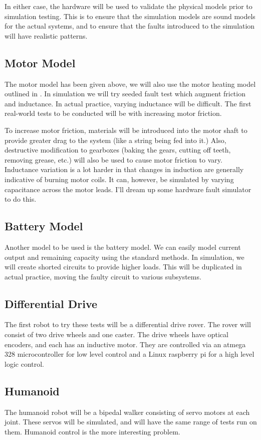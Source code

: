 \documentclass[12pt]{article}
\begin{document}
In either case, the hardware will be used to validate the physical
models prior to simulation testing.  This is to ensure that the
simulation models are sound models for the actual systems, and to
ensure that the faults introduced to the simulation will have
realistic patterns.

\subsection{Motor Model}
The motor model has been given above, we will also use the motor
heating model outlined in \cite{balaban}.  In simulation we will try
seeded fault test which augment friction and inductance.  In actual
practice, varying inductance will be difficult.  The first real-world
tests to be conducted will be with increasing motor friction.

To increase motor friction, materials will be introduced into the
motor shaft to provide greater drag to the system (like a string being
fed into it.)  Also, destructive modification to gearboxes (baking the
gears, cutting off teeth, removing grease, etc.) will also be used to
cause motor friction to vary.  Inductance variation is a lot harder in
that changes in induction are generally indicative of burning motor
coils.  It can, however, be simulated by varying capacitance across
the motor leads.  I'll dream up some hardware fault simulator to do
this.


\subsection{Battery Model}
Another model to be used is the battery model.  We can easily model
current output and remaining capacity using the standard methods.  In
simulation, we will create shorted circuits to provide higher loads.
This will be duplicated in actual practice, moving the faulty circuit
to various subsystems.

\subsection{Differential Drive}
The first robot to try these tests will be a differential drive
rover.  The rover will consist of two drive wheels and one caster.
The drive wheels have optical encoders, and each has an inductive
motor.  They are controlled via an atmega 328 microcontroller for low
level control and a Linux raspberry pi for a high level logic
control. 

\subsection{Humanoid}
The humanoid robot will be a bipedal walker consisting of servo motors
at each joint.  These servos will be simulated, and will have the same
range of tests run on them.  Humanoid control is the more interesting problem.
\end{document}
